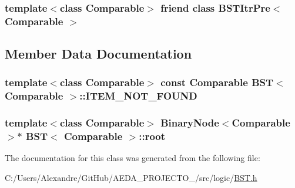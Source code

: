 \subsubsection[{B\+S\+T\+Itr\+Pre$<$ Comparable $>$}]{\setlength{\rightskip}{0pt plus 5cm}template$<$class Comparable$>$ friend class {\bf B\+S\+T\+Itr\+Pre}$<$ Comparable $>$\hspace{0.3cm}{\ttfamily [friend]}}\label{class_b_s_t_a45a55df6f11541416d4ea7684c575c1a}


\subsection{Member Data Documentation}
\hypertarget{class_b_s_t_a93811f042c4201e993fe39638c15f251}{}
\subsubsection[{I\+T\+E\+M\+\_\+\+N\+O\+T\+\_\+\+F\+O\+U\+N\+D}]{\setlength{\rightskip}{0pt plus 5cm}template$<$class Comparable$>$ const Comparable {\bf B\+S\+T}$<$ Comparable $>$\+::I\+T\+E\+M\+\_\+\+N\+O\+T\+\_\+\+F\+O\+U\+N\+D\hspace{0.3cm}{\ttfamily [private]}}\label{class_b_s_t_a93811f042c4201e993fe39638c15f251}
\hypertarget{class_b_s_t_a48d08a19c48c0c260a7d5db37149ad0f}{}
\subsubsection[{root}]{\setlength{\rightskip}{0pt plus 5cm}template$<$class Comparable$>$ {\bf Binary\+Node}$<$Comparable$>$$\ast$ {\bf B\+S\+T}$<$ Comparable $>$\+::root\hspace{0.3cm}{\ttfamily [private]}}\label{class_b_s_t_a48d08a19c48c0c260a7d5db37149ad0f}


The documentation for this class was generated from the following file\+:\begin{DoxyCompactItemize}
\item 
C\+:/\+Users/\+Alexandre/\+Git\+Hub/\+A\+E\+D\+A\+\_\+\+P\+R\+O\+J\+E\+C\+T\+O\+\_/src/logic/\hyperlink{_b_s_t_8h}{B\+S\+T.\+h}\end{DoxyCompactItemize}
